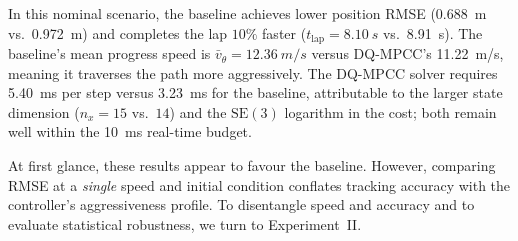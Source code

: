 In this nominal scenario, the baseline achieves lower position
RMSE (\SI{0.688}{m} vs.\ \SI{0.972}{m}) and completes the lap
$10\%$ faster ($t_{\text{lap}} = \SI{8.10}{s}$ vs.\ \SI{8.91}{s}).
The baseline's mean progress speed is $\bar v_\theta = \SI{12.36}{m/s}$
versus DQ-MPCC's \SI{11.22}{m/s}, meaning it traverses the path
more aggressively.
The DQ-MPCC solver requires \SI{5.40}{ms} per step versus
\SI{3.23}{ms} for the baseline, attributable to the larger
state dimension ($n_x = 15$ vs.~$14$) and the $\mathrm{SE}(3)$
logarithm in the cost; both remain well within the \SI{10}{ms}
real-time budget.

At first glance, these results appear to favour the baseline.
However, comparing RMSE at a \emph{single} speed and initial
condition conflates tracking accuracy with the controller's
aggressiveness profile.
To disentangle speed and accuracy and to evaluate statistical
robustness, we turn to Experiment~II.
